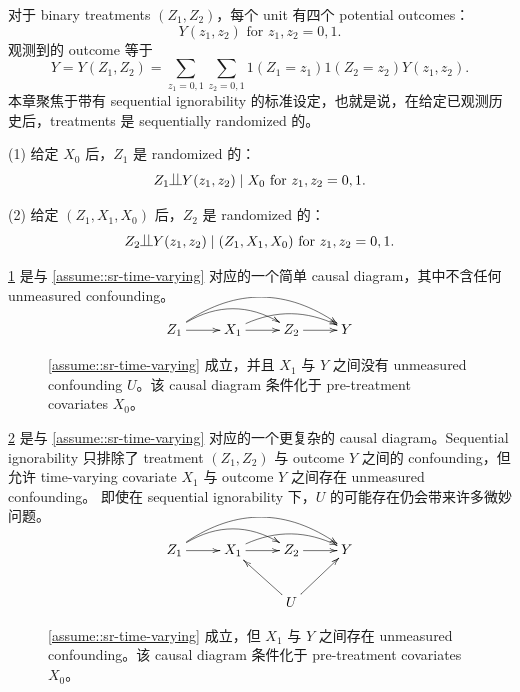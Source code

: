 对于 binary treatments $(Z_1, Z_2 )$，每个 unit 有四个 potential outcomes：
$$
Y(z_1, z_2)  \text{ for } z_1, z_2  = 0, 1.
$$ 
观测到的 outcome 等于
$$
Y = Y(Z_1,Z_2) = \sum_{z_1=0,1} \sum_{z_2=0,1}  1(Z_1=z_1) 1(Z_2=z_2) Y(z_1, z_2).
$$
本章聚焦于带有 sequential ignorability 的标准设定，也就是说，在给定已观测历史后，treatments 是 sequentially randomized 的。

\begin{assumption}
\label{assume::sr-time-varying} 
(1)
给定 $X_0$ 后，$Z_1$ 是 randomized 的：
$$
Z_1 \ind Y(z_1, z_2) \mid X_0 \text{ for } z_1, z_2  = 0, 1.
$$

(2)
给定 $( Z_1, X_1, X_0)$ 后，$Z_2$ 是 randomized 的：
$$
Z_2\ind Y(z_1, z_2) \mid (Z_1, X_1, X_0) \text{ for } z_1, z_2  = 0, 1.
$$
\end{assumption}
 
 
 \cref{fig::si-simple} 是与 \cref{assume::sr-time-varying} 对应的一个简单 causal diagram，其中不含任何 unmeasured confounding。
 
\begin{figure}
\bigskip 
$$
 \xymatrix{
 Z_1 \ar[r]  \ar@/^1.3pc/[rr]  \ar@/^2.0pc/[rrr] & X_1  \ar@/^1pc/[rr]\ar[r]  & Z_2  \ar[r] & Y
 }
 $$
 \caption{\cref{assume::sr-time-varying} 成立，并且 $X_1$ 与 $Y$ 之间没有 unmeasured confounding $U$。该 causal diagram 条件化于 pre-treatment covariates $X_0$。}\label{fig::si-simple}
\end{figure}



  \cref{fig::si-complex} 是与 \cref{assume::sr-time-varying} 对应的一个更复杂的 causal diagram。Sequential ignorability 只排除了 treatment $( Z_1, Z_2) $ 与 outcome $Y$ 之间的 confounding，但允许 time-varying covariate $X_1$ 与 outcome $Y$ 之间存在 unmeasured confounding。
  即使在 sequential ignorability 下，$U$ 的可能存在仍会带来许多微妙问题。

\begin{figure}
\bigskip 
$$
 \xymatrix{
 Z_1 \ar[r] \ar@/^1.3pc/[rr] \ar@/^2.0pc/[rrr] & X_1  \ar@/^1pc/[rr]\ar[r]  & Z_2  \ar[r] & Y \\
                                             &                                             &U\ar[lu]\ar[ru]
 }
 $$
 \caption{\cref{assume::sr-time-varying} 成立，但 $X_1$ 与 $Y$ 之间存在 unmeasured confounding。该 causal diagram 条件化于 pre-treatment covariates $X_0$。}\label{fig::si-complex}
\end{figure}



